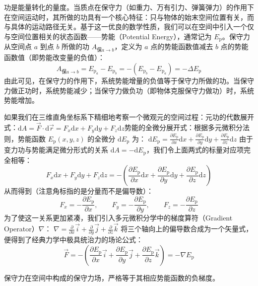 \documentclass[lang=cn,11pt]{elegantbook}
\begin{document}
\begin{definition}[势能]
功是能量转化的量度。当质点在保守力（如重力、万有引力、弹簧弹力）的作用下在空间运动时，其所做的功具有一个核心特征：只与物体的始末空间位置有关，而与具体的运动路径无关。基于这一优良的数学性质，我们可以在空间中引入一个仅与空间位置相关的状态函数——势能（Potential Energy），通常记为 $E_{\text{p}}$。保守力从空间点 $a$ 到点 $b$ 所做的功 $A_{\text{保}a \to b}$，定义为 $a$ 点的势能函数值减去 $b$ 点的势能函数值（即势能改变量的负值）：$$A_{\text{保}a \to b} = E_{\text{p}_a} - E_{\text{p}_b} = -\left(E_{\text{p}_b} - E_{\text{p}_a}\right) = -\Delta E_{\text{p}}$$由此可见，在保守力的作用下，系统势能增量的负值等于保守力所做的功。当保守力做正功时，系统势能减少；当保守力做负功（即物体克服保守力做功）时，系统势能增加。
\end{definition}
如果我们在三维直角坐标系下精细地考察一个微观元的空间过程：元功的代数展开式：$\mathrm{d}A = \vec{F} \cdot \mathrm{d}\vec{r} = F_x\mathrm{d}x + F_y\mathrm{d}y + F_z\mathrm{d}z$势能的全微分展开式：根据多元微积分法则，势能函数 $E_{\text{p}}(x, y, z)$ 的全微分 $\mathrm{d}E_{\text{p}}$ 为：
 \(\mathrm{d}E_{\text{p}} = \frac{\partial E_{\text{p}}}{\partial x}\mathrm{d}x + \frac{\partial E_{\text{p}}}{\partial y}\mathrm{d}y + \frac{\partial E_{\text{p}}}{\partial z}\mathrm{d}z\) 
由于变力功与势能满足微分形式的关系 $\mathrm{d}A = -\mathrm{d}E_{\text{p}}$，我们令上面两式的标量对应项完全相等：
$$F_x\mathrm{d}x + F_y\mathrm{d}y + F_z\mathrm{d}z = -\left( \frac{\partial E_{\text{p}}}{\partial x}\mathrm{d}x + \frac{\partial E_{\text{p}}}{\partial y}\mathrm{d}y + \frac{\partial E_{\text{p}}}{\partial z}\mathrm{d}z \right)$$
从而得到（注意角标指的是分量而不是偏导数）：
$$F_x = -\frac{\partial E_{\text{p}}}{\partial x}, \qquad F_y = -\frac{\partial E_{\text{p}}}{\partial y}, \qquad F_z = -\frac{\partial E_{\text{p}}}{\partial z}$$
为了使这一关系更加紧凑，我们引入多元微积分学中的梯度算符（Gradient Operator）$\nabla$：
 \(\nabla = \frac{\partial}{\partial x}\vec{i} + \frac{\partial}{\partial y}\vec{j} + \frac{\partial}{\partial z}\vec{k}\) 
将三个轴向上的偏导数合成为一个矢量式，便得到了经典力学中极具统治力的场论公式：
$$\vec{F} = -\left( \frac{\partial E_{\text{p}}}{\partial x}\vec{i} + \frac{\partial E_{\text{p}}}{\partial y}\vec{j} + \frac{\partial E_{\text{p}}}{\partial z}\vec{k} \right) = -\nabla E_{\text{p}}$$

\begin{theorem}
保守力在空间中构成的保守力场，严格等于其相应势能函数的负梯度。
\end{theorem}
\end{document}
